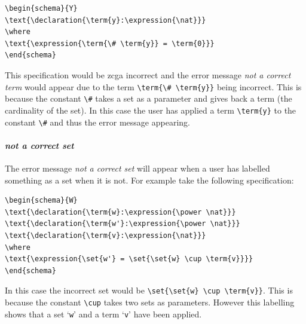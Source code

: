 \begin{exam}
\begin{verbatim}       
\begin{schema}{Y}
\text{\declaration{\term{y}:\expression{\nat}}}
\where
\text{\expression{\term{\# \term{y}} = \term{0}}}
\end{schema}
\end{verbatim}
\end{exam}

This specification would be \gls{zcga} incorrect and the error message \emph{not a correct term} would appear due to the term \verb|\term{\# \term{y}}| being incorrect. This is because the constant \verb|\#| takes a set as a parameter and gives back a term (the cardinality of the set). In this case the user has applied a term \verb|\term{y}| to the constant \verb|\#| and thus the error message appearing.

\paragraph{\emph{not a correct set}}

The error message \emph{not a correct set} will appear when a user has labelled something as a set when it is not. For example take the following specification:

\begin{exam}
\begin{verbatim}       
\begin{schema}{W}
\text{\declaration{\term{w}:\expression{\power \nat}}}
\text{\declaration{\term{w'}:\expression{\power \nat}}}
\text{\declaration{\term{v}:\expression{\nat}}}
\where
\text{\expression{\set{w'} = \set{\set{w} \cup \term{v}}}}
\end{schema}
\end{verbatim}
\end{exam}

In this case the incorrect set would be \verb|\set{\set{w} \cup \term{v}}|. This is because the constant \verb|\cup| takes two sets as parameters. However this labelling shows that a set `\verb|w|' and a term `\verb|v|' have been applied. 



